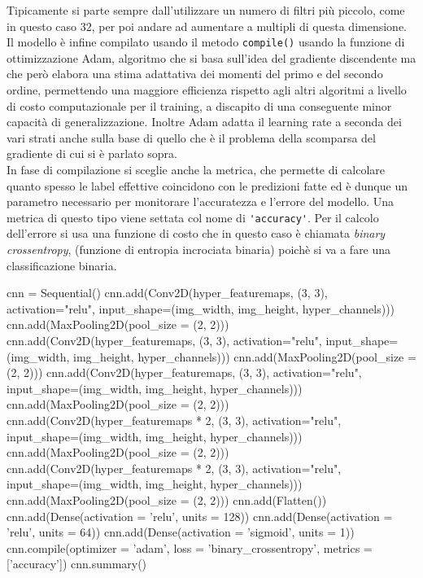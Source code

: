 Tipicamente si parte sempre dall’utilizzare un numero di filtri più piccolo, come in questo caso 32,
 per poi andare ad aumentare a multipli di questa dimensione. 
Il modello è infine compilato usando il metodo \lstinline{compile()} usando la funzione di ottimizzazione Adam, 
algoritmo che si
 basa sull’idea del gradiente discendente ma che però elabora una stima adattativa dei momenti 
 del primo e del secondo ordine, permettendo una maggiore efficienza rispetto agli altri algoritmi
  a livello di costo computazionale per il training, a discapito di una conseguente minor capacità
   di generalizzazione. Inoltre Adam adatta il learning rate a seconda dei vari strati anche sulla base
    di quello che è il problema della scomparsa del gradiente di cui si è parlato sopra. \\
In fase di compilazione si sceglie anche la metrica, che permette di calcolare quanto spesso le label effettive
 coincidono con
 le predizioni fatte ed è dunque un parametro necessario per monitorare l’accuratezza e l’errore del modello.
  Una metrica di questo tipo viene settata col nome di \lstinline{'accuracy'}. 
  Per il calcolo dell’errore si usa una funzione di costo che in questo caso è chiamata \emph{binary crossentropy},
   (funzione di entropia incrociata binaria) poichè si va a fare una classificazione binaria.\\


   
    
\begin{python} %
cnn = Sequential()
cnn.add(Conv2D(hyper_featuremaps, (3, 3), activation="relu", input_shape=(img_width, img_height, hyper_channels)))
cnn.add(MaxPooling2D(pool_size = (2, 2)))
cnn.add(Conv2D(hyper_featuremaps, (3, 3), activation="relu", input_shape=(img_width, img_height, hyper_channels)))
cnn.add(MaxPooling2D(pool_size = (2, 2)))
cnn.add(Conv2D(hyper_featuremaps, (3, 3), activation="relu", input_shape=(img_width, img_height, hyper_channels)))
cnn.add(MaxPooling2D(pool_size = (2, 2)))
cnn.add(Conv2D(hyper_featuremaps * 2, (3, 3), activation="relu", input_shape=(img_width, img_height, hyper_channels)))
cnn.add(MaxPooling2D(pool_size = (2, 2)))
cnn.add(Conv2D(hyper_featuremaps * 2, (3, 3), activation="relu", input_shape=(img_width, img_height, hyper_channels)))
cnn.add(MaxPooling2D(pool_size = (2, 2)))
cnn.add(Flatten())
cnn.add(Dense(activation = 'relu', units = 128))
cnn.add(Dense(activation = 'relu', units = 64))
cnn.add(Dense(activation = 'sigmoid', units = 1))
cnn.compile(optimizer = 'adam', loss = 'binary_crossentropy', metrics = ['accuracy'])
cnn.summary()

\end{python}
\begin{lstlisting}[caption= {Modello in Python utilizzato} ]
\end{lstlisting}

